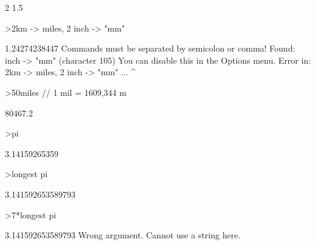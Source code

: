 \documentclass[12pt,arial,letterpaper]{book}
\begin{document}
\begin{eulernootebook}
\begin{eulercomment}
\begin{eulercomment}
\begin{euleroutput}
  2
  1.5
\end{euleroutput}
\begin{eulerprompt}
>2km -> miles, 2 inch -> "mm"
\end{eulerprompt}
\begin{euleroutput}
  1.24274238447
  Commands must be separated by semicolon or comma!
  Found: inch -> "mm" (character 105)
  You can disable this in the Options menu.
  Error in:
  2km -> miles, 2 inch -> "mm" ...
                  ^
\end{euleroutput}
\begin{eulerprompt}
>50miles // 1 mil = 1609,344 m
\end{eulerprompt}
\begin{euleroutput}
  80467.2
\end{euleroutput}
\begin{eulerprompt}
>pi
\end{eulerprompt}
\begin{euleroutput}
  3.14159265359
\end{euleroutput}
\begin{eulerprompt}
>longest pi
\end{eulerprompt}
\begin{euleroutput}
        3.141592653589793 
\end{euleroutput}
\begin{eulerprompt}
>7*longest pi
\end{eulerprompt}
\begin{euleroutput}
        3.141592653589793 
  Wrong argument.
  Cannot use a string here.
  

\end{euleroutput}
\end{eulercomment}
\end{eulercomment}
\end{eulernootebook}
\end{document}

